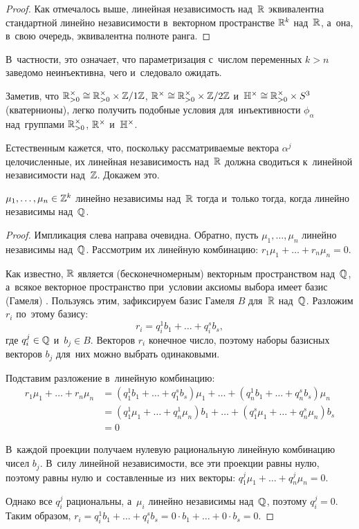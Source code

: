 \documentclass{article}
\begin{document}
\begin{proof}
    Как отмечалось выше, линейная независимость над~$\mathbb{R}$ эквивалентна стандартной линейно независимости
    в~векторном пространстве $\mathbb{R}^k$ над~$\mathbb{R}$, а~она, в~свою очередь, эквивалентна полноте ранга.
\end{proof}

В~частности, это означает, что параметризация с~числом переменных $k > n$ заведомо неинъективна, чего и~следовало ожидать.

Заметив, что $\mathbb{R}_{>0}^\times \cong \mathbb{R}_{>0}^\times \times \mathbb{Z} / 1\mathbb{Z}$, $\mathbb{R}^\times \cong \mathbb{R}_{>0}^\times \times \mathbb{Z} / 2 \mathbb{Z}$
и~$\mathbb{H}^\times \cong \mathbb{R}_{>0}^\times \times S^3$ (кватернионы), легко получить подобные условия для~инъективности
$\phi_\alpha$ над~группами $\mathbb{R}_{>0}^\times$, $\mathbb{R}^\times$ и~$\mathbb{H}^\times$.

Естественным кажется, что, поскольку рассматриваемые вектора $\alpha^j$ целочисленные, их линейная независимость
над~$\mathbb{R}$ должна сводиться к~линейной независимости над~$\mathbb{Z}$. Докажем это.

\begin{lemma*}
    $\mu_1, \ldots, \mu_n \in \mathbb{Z}^k$ линейно независимы над~$\mathbb{R}$ тогда и~только тогда, когда линейно независимы над~$\mathbb{Q}$.
\end{lemma*}

\begin{proof}
    Импликация слева направа очевидна. Обратно, пусть $\mu_1, \ldots, \mu_n$ линейно независимы над~$\mathbb{Q}$.
    Рассмотрим их линейную комбинацию: $r_1 \mu_1 + \ldots + r_n \mu_n = 0$.

    Как известно, $\mathbb{R}$ является (бесконечномерным) векторным пространством над~$\mathbb{Q}$, а~всякое векторное пространство
    при~условии аксиомы выбора имеет базис (Гамеля) \cite{Brbk70}. Пользуясь этим, зафиксируем базис Гамеля $B$ для~$\mathbb{R}$ над~$\mathbb{Q}$.
    Разложим $r_i$ по~этому базису:
    $$
        r_i = q_i^1 b_1 + \ldots + q_i^s b_s,
    $$
    где $q_i^j \in \mathbb{Q}$ и~$b_j \in B$. Векторов $r_i$ конечное число, поэтому наборы базисных векторов $b_j$ для~них можно выбрать одинаковыми.

    Подставим разложение в~линейную комбинацию:
    \begin{align*}
        r_1 \mu_1 + \ldots + r_n \mu_n & = (q_1^1 b_1 + \ldots + q_1^s b_s) \mu_1 + \ldots + (q_n^1 b_1 + \ldots + q_n^s b_s) \mu_n \\
                                       & = (q_1^1 \mu_1 + \ldots + q_n^1 \mu_n) b_1 + \ldots + (q_1^s \mu_1 + \ldots + q_n^s \mu_n) b_s \\
                                       & = 0
    \end{align*}

    В~каждой проекции получаем нулевую рациональную линейную комбинацию чисел $b_j$. В~силу линейной независимости,
    все эти проекции равны нулю, поэтому равны нулю и~составленные из~них векторы: $q_1^j \mu_1 + \ldots + q_n^j \mu_n = 0$.

    Однако все $q_i^j$ рациональны, а~$\mu_i$ линейно независимы над~$\mathbb{Q}$, поэтому $q_i^j = 0$.
    Таким образом, $r_i = q_i^1 b_1 + \ldots + q_i^s b_s = 0 \cdot b_1 + \ldots + 0 \cdot b_s = 0$.
\end{proof}
\end{document}
